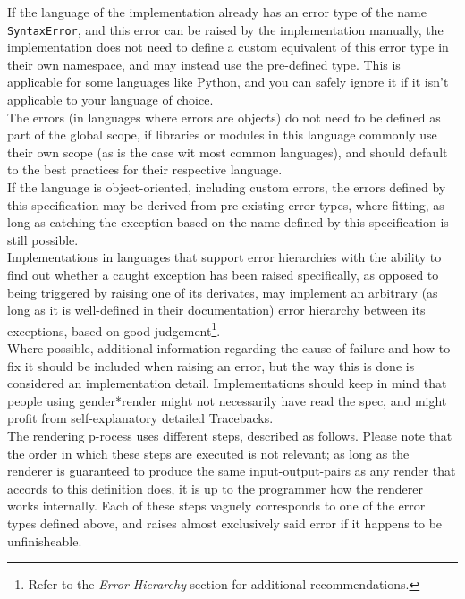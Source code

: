 \documentclass{article}
\newcommand{\GenderRender}{
    gender*render
}
\begin{document}
    If the language of the implementation already has an error type of the name \texttt{SyntaxError}, and this error can be raised by the implementation manually, the implementation does not need to define a custom equivalent of this error type in their own namespace, and may instead use the pre-defined type.
    This is applicable for some languages like Python, and you can safely ignore it if it isn't applicable to your language of choice.\\
    The errors (in languages where errors are objects) do not need to be defined as part of the global scope, if libraries or modules in this language commonly use their own scope (as is the case wit most common languages), and should default to the best practices for their respective language.\\
    If the language is object-oriented, including custom errors, the errors defined by this specification may be derived from pre-existing error types, where fitting, as long as catching the exception based on the name defined by this specification is still possible.\\
    Implementations in languages that support error hierarchies with the ability to find out whether a caught exception has been raised specifically, as opposed to being triggered by raising one of its derivates, may implement an arbitrary (as long as it is well-defined in their documentation) error hierarchy between its exceptions, based on good judgement\footnote{Refer to the \emph{Error Hierarchy} section for additional recommendations.}.\\
    Where possible, additional information regarding the cause of failure and how to fix it should be included when raising an error, but the way this is done is considered an implementation detail.
    Implementations should keep in mind that people using \GenderRender might not necessarily have read the spec, and might profit from self-explanatory detailed Tracebacks.\\

    The rendering p-rocess uses different steps, described as follows.
    Please note that the order in which these steps are executed is not relevant;
    as long as the renderer is guaranteed to produce the same input-output-pairs as any render that accords to this definition does, it is up to the programmer how the renderer works internally.
    Each of these steps vaguely corresponds to one of the error types defined above, and raises almost exclusively said error if it happens to be unfinisheable.\\
\end{document}
